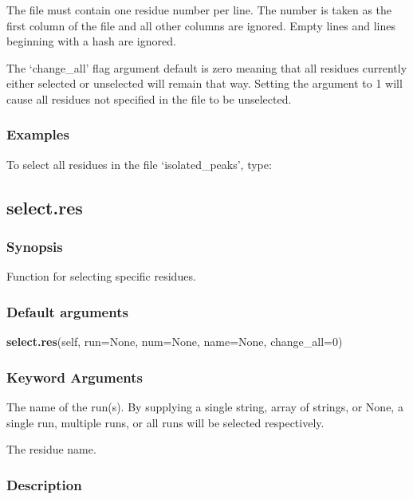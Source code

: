 The file must contain one residue number per line.  The number is taken as the first column
of the file and all other columns are ignored.  Empty lines and lines beginning with a hash
are ignored.

The `change\_all' flag argument default is zero meaning that all residues currently either
selected or unselected will remain that way.  Setting the argument to 1 will cause all
residues not specified in the file to be unselected.


\subsubsection{Examples}

To select all residues in the file `isolated\_peaks', type:




\newpage

\subsection{select.res}


\subsubsection{Synopsis}

Function for selecting specific residues.

\subsubsection{Default arguments}

\textsf{\textbf{select.res}(self, run=None, num=None, name=None, change\_all=0)}


\subsubsection{Keyword Arguments}

  The name of the run(s).  By supplying a single string, array of strings, or None, a single run, multiple runs, or all runs will be selected respectively.

  The residue name.


\subsubsection{Description}

